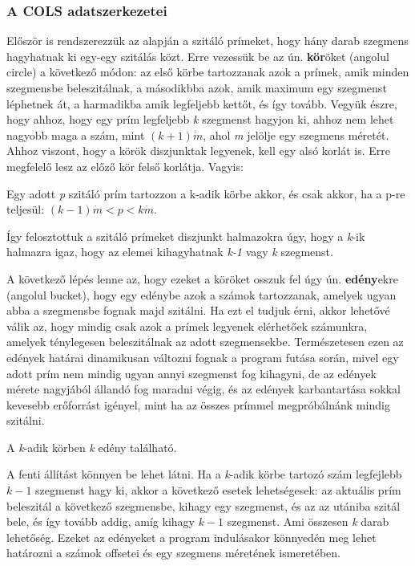 \documentclass[twoside, a4paper, 12pt]{article}
\begin{document}
\subsubsection{A COLS adatszerkezetei}

Először is rendszerezzük az alapján a szitáló prímeket, hogy hány darab szegmens hagyhatnak ki egy-egy szitálás közt. Erre vezessük be az ún. \textbf{kör}öket (angolul circle) a következő módon: az első körbe tartozzanak azok a prímek, amik minden szegmensbe beleszitálnak, a másodikbba azok, amik maximum egy szegmenst léphetnek át, a harmadikba amik legfeljebb kettőt, és így tovább. Vegyük észre, hogy ahhoz, hogy egy prím legfeljebb \textit{k} szegmenst hagyjon ki, ahhoz nem lehet nagyobb maga a szám, mint $(k+1) \dot m$, ahol \textit{m} jelölje egy szegmens méretét. Ahhoz viszont, hogy a körök diszjunktak legyenek, kell egy alsó korlát is. Erre megfelelő lesz az előző kör felső korlátja. Vagyis:
\begin{definition}
Egy adott  \textit{p} szitáló prím tartozzon a k-adik körbe akkor, és csak akkor, ha a p-re teljesül: $(k-1) \dot m < p < k \dot m$.
\end{definition}
Így felosztottuk a szitáló prímeket diszjunkt halmazokra úgy, hogy a \textit{k}-ik halmazra igaz, hogy az elemei kihagyhatnak \textit{k-1} vagy \textit{k} szegmenst. \par
\bigskip \bigskip
A következő lépés lenne az, hogy ezeket a köröket osszuk fel úgy ún. \textbf{edény}ekre (angolul bucket), hogy egy edénybe azok a számok tartozzanak, amelyek ugyan abba a szegmensbe fognak majd szitálni. Ha ezt el tudjuk érni, akkor lehetővé válik az, hogy mindig csak azok a prímek legyenek elérhetőek számunkra, amelyek ténylegesen beleszitálnak az adott szegmensekbe. Természetesen ezen az edények határai dinamikusan változni fognak a program futása során, mivel egy adott prím nem mindig ugyan annyi szegmenst fog kihagyni, de az edények mérete nagyjából állandó fog maradni végig, és az edények karbantartása sokkal kevesebb erőforrást igényel, mint ha az összes prímmel megpróbálnánk mindig szitálni. \par
\begin{theorem}
A \textit{k}-adik körben \textit{k} edény található.
\end{theorem}
A fenti állítást könnyen be lehet látni. Ha a \textit{k}-adik körbe tartozó szám legfejlebb $k-1$ szegmenst hagy ki, akkor a következő esetek lehetségesek: az aktuális prím beleszitál a következő szegmensbe, kihagy egy szegmenst, és az az utániba szitál bele, és így tovább addig, amíg kihagy $k-1$ szegmenst. Ami összesen \textit{k} darab lehetőség. Ezeket az edényeket a program indulásakor könnyedén meg lehet határozni a számok offsetei és egy szegmens méretének ismeretében. \par \bigskip
\end{document}
